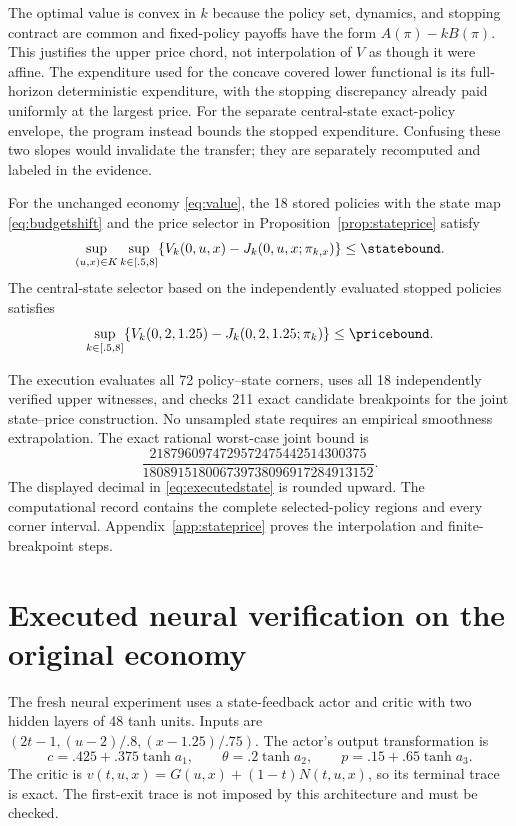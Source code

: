 The optimal value is convex in $k$ because the policy set, dynamics, and stopping contract are common and fixed-policy payoffs have the form $A(\pi)-kB(\pi)$. This justifies the upper price chord, not interpolation of $V$ as though it were affine. The expenditure used for the concave covered lower functional is its full-horizon deterministic expenditure, with the stopping discrepancy already paid uniformly at the largest price. For the separate central-state exact-policy envelope, the program instead bounds the stopped expenditure. Confusing these two slopes would invalidate the transfer; they are separately recomputed and labeled in the evidence.

\begin{proposition}\label{prop:executed}
For the unchanged economy \eqref{eq:value}, the 18 stored policies with the state map \eqref{eq:budgetshift} and the price selector in Proposition~\ref{prop:stateprice} satisfy
\begin{equation}
 \sup_{(u,x)\in K}\sup_{k\in[.5,8]}
 \{V_k(0,u,x)-J_k(0,u,x;\pi_{k,x})\}\leq\statebound.
 \label{eq:executedstate}
\end{equation}
The central-state selector based on the independently evaluated stopped policies satisfies
\begin{equation}
 \sup_{k\in[.5,8]}
 \{V_k(0,2,1.25)-J_k(0,2,1.25;\pi_k)\}\leq\pricebound.
 \label{eq:executedprice}
\end{equation}
\end{proposition}

The execution evaluates all 72 policy--state corners, uses all 18 independently verified upper witnesses, and checks 211 exact candidate breakpoints for the joint state--price construction. No unsampled state requires an empirical smoothness extrapolation. The exact rational worst-case joint bound is
\[
 \frac{2187960974729572475442514300375}{180891518006739738096917284913152}.
\]
The displayed decimal in \eqref{eq:executedstate} is rounded upward. The computational record contains the complete selected-policy regions and every corner interval. Appendix~\ref{app:stateprice} proves the interpolation and finite-breakpoint steps.

\section{Executed neural verification on the original economy}\label{sec:neural}
The fresh neural experiment uses a state-feedback actor and critic with two hidden layers of 48 tanh units. Inputs are $(2t-1,(u-2)/.8,(x-1.25)/.75)$. The actor's output transformation is
\[
 c=.425+.375\tanh a_1,\qquad
 \theta=.2\tanh a_2,\qquad
 p=.15+.65\tanh a_3.
\]
The critic is $v(t,u,x)=G(u,x)+(1-t)N(t,u,x)$, so its terminal trace is exact. The first-exit trace is not imposed by this architecture and must be checked.

